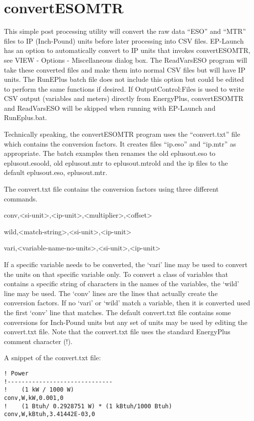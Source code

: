 \chapter{convertESOMTR}\label{convertesomtr}

This simple post processing utility will convert the raw data ``ESO'' and ``MTR'' files to IP (Inch-Pound) units before later processing into CSV files. EP-Launch has an option to automatically convert to IP units that invokes convertESOMTR, see VIEW - Options - Miscellaneous dialog box. The ReadVarsESO program will take these converted files and make them into normal CSV files but will have IP units. The RunEPlus batch file does not include this option but could be edited to perform the same functions if desired. If OutputControl:Files is used to write CSV output (variables and meters) directly from EnergyPlus, convertESOMTR and ReadVarsESO will be skipped when running with EP-Launch and RunEplus.bat.

Technically speaking, the convertESOMTR program uses the ``convert.txt'' file which contains the conversion factors. It creates files ``ip.eso'' and ``ip.mtr'' as appropriate. The batch examples then renames the old eplusout.eso to eplusout.esoold, old eplusout.mtr to eplusout.mtrold and the ip files to the default eplusout.eso, eplusout.mtr.

The convert.txt file contains the conversion factors using three different commands.

conv,\textless{}si-unit\textgreater{},\textless{}ip-unit\textgreater{},\textless{}multiplier\textgreater{},\textless{}offset\textgreater{}

wild,\textless{}match-string\textgreater{},\textless{}si-unit\textgreater{},\textless{}ip-unit\textgreater{}

vari,\textless{}variable-name-no-units\textgreater{},\textless{}si-unit\textgreater{},\textless{}ip-unit\textgreater{}

If a specific variable needs to be converted, the `vari' line may be used to convert the units on that specific variable only. To convert a class of variables that contains a specific string of characters in the names of the variables, the `wild' line may be used. The `conv' lines are the lines that actually create the conversion factors. If no `vari' or `wild' match a variable, then it is converted used the first `conv' line that matches. The default convert.txt file contains some conversions for Inch-Pound units but any set of units may be used by editing the convert.txt file. Note that the convert.txt file uses the standard EnergyPlus comment character (!).

A snippet of the convert.txt file:

\begin{lstlisting}
! Power
!------------------------------
!    (1 kW / 1000 W)
conv,W,kW,0.001,0
!    (1 Btuh/ 0.2928751 W) * (1 kBtuh/1000 Btuh)
conv,W,kBtuh,3.41442E-03,0
\end{lstlisting}
